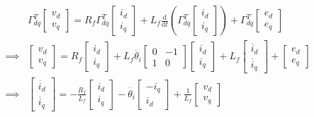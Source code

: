 \begin{align}\label{eq:i_d_i_q_ss_model}
	& \Gamma_{dq}^T\begin{bmatrix}
		v_d\\v_q
	\end{bmatrix} = R_f\Gamma_{dq}^T\begin{bmatrix}
		i_d\\i_q
	\end{bmatrix} + L_f \frac{\text{d}}{\text{d}t}\left(\Gamma_{dq}^T\begin{bmatrix}
		i_d\\i_q
	\end{bmatrix}\right)+\Gamma_{dq}^T\begin{bmatrix}
		e_d\\e_q
	\end{bmatrix} \nonumber\\
	\implies & \begin{bmatrix}
		v_d\\v_q
	\end{bmatrix} = R_f \begin{bmatrix}
		i_d\\i_q
	\end{bmatrix} + L_f \dot{\theta_i}\begin{bmatrix}
		0 & -1\\1 & 0
	\end{bmatrix}\begin{bmatrix}
		i_d\\i_q
	\end{bmatrix} + L_f \begin{bmatrix}
		\dot{i_d}\\\dot{i_q}
	\end{bmatrix} + \begin{bmatrix}
		e_d\\e_q
	\end{bmatrix} \nonumber\\
	\implies & \begin{bmatrix}
		\dot{i_d}\\ \dot{i_q}
	\end{bmatrix} = -\frac{R_f}{L_f}\begin{bmatrix}
		i_d\\i_q
	\end{bmatrix}-\dot{\theta_i}\begin{bmatrix}
		-i_q\\i_d
	\end{bmatrix}+\frac{1}{L_f}\begin{bmatrix}
		v_d\\v_q

\end{bmatrix}
\end{align}
